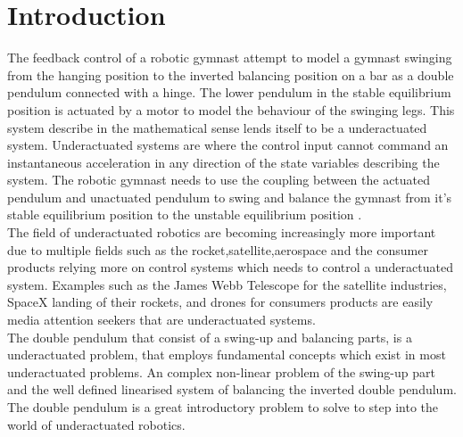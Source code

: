 \documentclass[a4paper,12pt]{article}
\begin{document}
%	
	\newpage
	\tableofcontents
	\newpage
	\listoffigures
	\newpage
	\listoftables
	\newpage

	\section{Introduction}
	The feedback control of a robotic gymnast attempt to model a gymnast swinging from the hanging position to the inverted balancing position on a bar as a double pendulum connected with a hinge. The lower pendulum in the stable equilibrium position is actuated by a motor to model the behaviour of the swinging legs. This system describe in the mathematical sense lends itself to be a underactuated system. Underactuated systems are where the control input cannot command an instantaneous acceleration in any direction of the state variables describing the system. The robotic gymnast needs to use the coupling between the actuated pendulum and unactuated pendulum to swing and balance the gymnast from it's stable equilibrium position to the unstable equilibrium position \cite{tedrake}.
	\\
	
	The field of underactuated robotics are becoming increasingly more important due to multiple fields such as the rocket,satellite,aerospace and the consumer products relying more on control systems which needs to control a underactuated system. Examples such as the James Webb Telescope for the satellite industries, SpaceX landing of their rockets, and drones for consumers products are easily media attention seekers that are underactuated systems. 
	\\
	
	The double pendulum that consist of a swing-up and balancing parts, is a underactuated problem, that employs fundamental concepts which exist in most underactuated problems. An complex non-linear problem of the swing-up part and the well defined linearised system of balancing the inverted double pendulum. The double pendulum is a great introductory problem to solve to step into the world of underactuated robotics.
	\\
	
\end{document}
